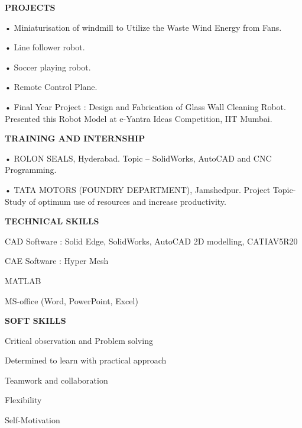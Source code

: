 \documentclass{article}
\begin{document}

\textbf{\LARGE PROJECTS}
\begin{enumerate}
	{\large \item •	Miniaturisation of windmill to Utilize the Waste Wind Energy from Fans.}
	{\large \item • Line follower robot.}
	{\large \item •	Soccer playing robot.}
	{\large \item •	Remote Control Plane.}
	{\large \item •	Final Year Project : Design and Fabrication of Glass Wall Cleaning Robot.\\
		Presented this Robot Model at e-Yantra Ideas Competition, IIT Mumbai.}
\end{enumerate}\vspace{15px}


\textbf{\LARGE TRAINING AND INTERNSHIP}
\begin{itemize}
{\large \item •	ROLON SEALS, Hyderabad. Topic – SolidWorks, AutoCAD and CNC Programming.}
{\large \item •	TATA MOTORS (FOUNDRY DEPARTMENT), Jamshedpur. Project Topic- Study of optimum use of resources and increase productivity.}
\end{itemize}\vspace{15px}




\textbf{\LARGE TECHNICAL SKILLS}
\begin{itemize}
	{\large \item CAD Software : Solid Edge, SolidWorks, AutoCAD 2D modelling, CATIAV5R20 }
	{\large \item CAE Software : Hyper Mesh}
	{\large \item MATLAB }
	{\large \item MS-office (Word, PowerPoint, Excel)}
\end{itemize}\vspace{15px}


\textbf{\LARGE SOFT SKILLS}
\begin{enumerate}
	{\large \item Critical observation and Problem solving }
	{\large \item Determined to learn with practical approach }
	{\large \item Teamwork and collaboration }
	{\large \item Flexibility }
	{\large \item Self-Motivation }
\end{enumerate}\vspace{15px}
\end{document}
